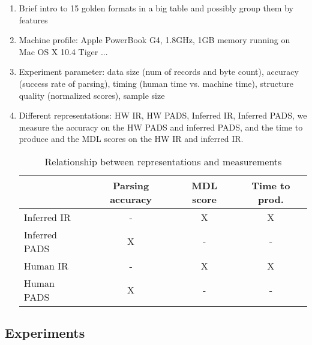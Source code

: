 \begin{enumerate}
\item Brief intro to 15 golden formats in a big table and possibly group them by
features

\item Machine profile: Apple PowerBook G4, 1.8GHz, 1GB memory running on Mac OS X 10.4 Tiger ...

\item Experiment parameter: data size (num of records and byte count), accuracy (success rate of parsing), 
timing (human time vs. machine time), structure quality (normalized scores), sample size

\item Different representations: HW IR, HW PADS, Inferred IR, Inferred PADS, we measure
the accuracy on the HW PADS and inferred PADS, and the time to produce and the MDL scores on
the HW IR and inferred IR.

\begin{table}
\begin{center}
\begin{tabular}{|l|c|c|c|} \hline
		& Parsing accuracy 	& MDL score 	&  Time to prod.\\ \hline
Inferred IR 	& -			& X		& X	\\ \hline
Inferred PADS	& X			& -		& -	\\ \hline 
Human IR	& -			& X		& X	\\ \hline	
Human PADS	& X			& -		& -	\\ \hline	
\end{tabular}
\caption{Relationship between representations and measurements}
\end{center}
\end{table}

\end{enumerate}

\subsection{Experiments}

